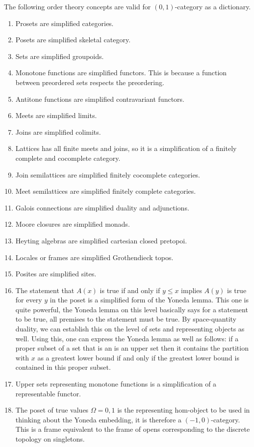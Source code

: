 \documentclass{tufte-book}
\begin{document}
 The following order theory concepts are valid for $(0,1)$-category as a dictionary.
 
 \begin{enumerate}
 	\item Prosets are simplified categories.
 	\item Posets are simplified skeletal category.
 	\item Sets are simplified groupoids.
 	\item Monotone functions are simplified functors. This is because a function between preordered sets respects the preordering.
 	\item Antitone functions are simplified contravariant functors.
 	\item Meets are simplified limits.
 	\item Joins are simplified colimits.
 	\item Lattices has all finite meets and joins, so it is a simplification of a finitely complete and cocomplete category.
 	\item Join semilattices are simplified finitely cocomplete categories.
 	\item Meet semilattices are simplified finitely complete categories.
 	\item Galois connections are simplified duality and adjunctions.
 	\item Moore closures are simplified monads.
 	\item Heyting algebras are simplified cartesian closed pretopoi.
 	\item Locales or frames are simplified Grothendieck topos.
 	\item Posites are simplified sites.
 	\item The statement that $A(x)$ is true if and only if $y \leq x$ implies $A(y)$ is true for every $y$ in the poset is a simplified form of the Yoneda lemma. This one is quite powerful, the Yoneda lemma on this level basically says for a statement to be true, all premises to the statement must be true. By space-quantity duality, we can establish this on the level of sets and representing objects as well. Using this, one can express the Yoneda lemma as well as follows: if a proper subset of a set that is an is an upper set then it contains the partition with $x$ as a greatest lower bound if and only if the greatest lower bound is contained in this proper subset. 
 	\item Upper sets representing monotone functions is a simplification of a representable functor. 
 	\item The poset of true values $\Omega = {0,1}$ is the representing hom-object to be used in thinking about the Yoneda embedding, it is therefore a $(-1,0)$-category. This is a frame equivalent to the frame of opens corresponding to the discrete topology on singletons.

\end{enumerate}
\end{document}
